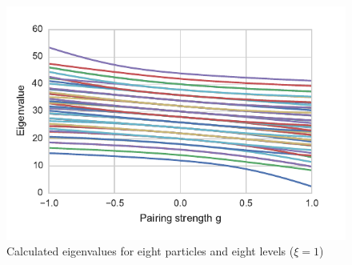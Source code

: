 \documentclass{article}
\begin{document}
	\begin{figure}[p]
		\centering
		\includegraphics{calc8.pdf}
		\caption{Calculated eigenvalues for eight particles and eight levels ($\xi=1$)}
		\label{fig:8lev_calc}
	\end{figure}
\end{document}
